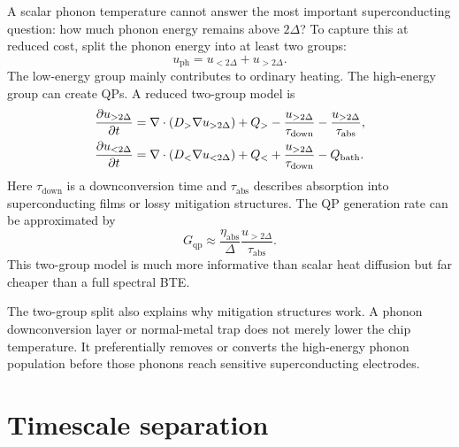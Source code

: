\documentclass[11pt]{article}
\begin{document}
A scalar phonon temperature cannot answer the most important superconducting question: how much phonon energy remains above \(2\Delta\)? To capture this at reduced cost, split the phonon energy into at least two groups:
\begin{equation}
u_{\mathrm{ph}} = u_{<2\Delta}+u_{>2\Delta}.
\end{equation}
The low-energy group mainly contributes to ordinary heating. The high-energy group can create QPs. A reduced two-group model is
\begin{align}
\pdv{u_{>2\Delta}}{t}
&=\nabla\cdot(D_{>}\nabla u_{>2\Delta})+Q_{>} - \frac{u_{>2\Delta}}{\tau_{\mathrm{down}}}
-\frac{u_{>2\Delta}}{\tau_{\mathrm{abs}}},
\label{eq:high_ph_group}\\
\pdv{u_{<2\Delta}}{t}
&=\nabla\cdot(D_{<}\nabla u_{<2\Delta})+Q_{<}+\frac{u_{>2\Delta}}{\tau_{\mathrm{down}}}-Q_{\mathrm{bath}}.
\label{eq:low_ph_group}
\end{align}
Here \(\tau_{\mathrm{down}}\) is a downconversion time and \(\tau_{\mathrm{abs}}\) describes absorption into superconducting films or lossy mitigation structures. The QP generation rate can be approximated by
\begin{equation}
G_{\mathrm{qp}}\approx \frac{\eta_{\mathrm{abs}}}{\Delta}\frac{u_{>2\Delta}}{\tau_{\mathrm{abs}}}.
\end{equation}
This two-group model is much more informative than scalar heat diffusion but far cheaper than a full spectral BTE.

The two-group split also explains why mitigation structures work. A phonon downconversion layer or normal-metal trap does not merely lower the chip temperature. It preferentially removes or converts the high-energy phonon population before those phonons reach sensitive superconducting electrodes.

\section{Timescale separation}
\end{document}
